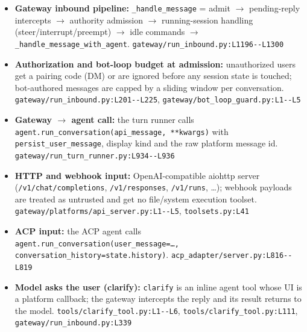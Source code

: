 \begin{itemize}
\item \textbf{Gateway inbound pipeline:} \texttt{\_\allowbreak{}handle\_\allowbreak{}message} = admit $\rightarrow$ pending-reply intercepts $\rightarrow$ authority admission $\rightarrow$ running-session handling (steer/interrupt/preempt) $\rightarrow$ idle commands $\rightarrow$ \texttt{\_\allowbreak{}handle\_\allowbreak{}message\_\allowbreak{}with\_\allowbreak{}agent}. \texttt{gateway/\allowbreak{}run\_\allowbreak{}inbound.\allowbreak{}py:\allowbreak{}L1196-\allowbreak{}-\allowbreak{}L1300}
\item \textbf{Authorization and bot-loop budget at admission:} unauthorized users get a pairing code (DM) or are ignored before any session state is touched; bot-authored messages are capped by a sliding window per conversation. \texttt{gateway/\allowbreak{}run\_\allowbreak{}inbound.\allowbreak{}py:\allowbreak{}L201-\allowbreak{}-\allowbreak{}L225}, \texttt{gateway/\allowbreak{}bot\_\allowbreak{}loop\_\allowbreak{}guard.\allowbreak{}py:\allowbreak{}L1-\allowbreak{}-\allowbreak{}L5}
\item \textbf{Gateway $\rightarrow$ agent call:} the turn runner calls \texttt{agent.\allowbreak{}run\_\allowbreak{}conversation(\allowbreak{}api\_\allowbreak{}message, **kwargs)} with \texttt{persist\_\allowbreak{}user\_\allowbreak{}message}, display kind and the raw platform message id. \texttt{gateway/\allowbreak{}run\_\allowbreak{}turn\_\allowbreak{}runner.\allowbreak{}py:\allowbreak{}L934-\allowbreak{}-\allowbreak{}L936}
\item \textbf{HTTP and webhook input:} OpenAI-compatible aiohttp server (\texttt{/\allowbreak{}v1/\allowbreak{}chat/\allowbreak{}completions}, \texttt{/\allowbreak{}v1/\allowbreak{}responses}, \texttt{/\allowbreak{}v1/\allowbreak{}runs}, \ldots{}); webhook payloads are treated as untrusted and get no file/system execution toolset. \texttt{gateway/\allowbreak{}platforms/\allowbreak{}api\_\allowbreak{}server.\allowbreak{}py:\allowbreak{}L1-\allowbreak{}-\allowbreak{}L5}, \texttt{toolsets.\allowbreak{}py:\allowbreak{}L41}
\item \textbf{ACP input:} the ACP agent calls \texttt{agent.\allowbreak{}run\_\allowbreak{}conversation(\allowbreak{}user\_\allowbreak{}message=\ldots{}, conversation\_\allowbreak{}history=state.\allowbreak{}history)}. \texttt{acp\_\allowbreak{}adapter/\allowbreak{}server.\allowbreak{}py:\allowbreak{}L816-\allowbreak{}-\allowbreak{}L819}
\item \textbf{Model asks the user (clarify):} \texttt{clarify} is an inline agent tool whose UI is a platform callback; the gateway intercepts the reply and its result returns to the model. \texttt{tools/\allowbreak{}clarify\_\allowbreak{}tool.\allowbreak{}py:\allowbreak{}L1-\allowbreak{}-\allowbreak{}L6}, \texttt{tools/\allowbreak{}clarify\_\allowbreak{}tool.\allowbreak{}py:\allowbreak{}L111}, \texttt{gateway/\allowbreak{}run\_\allowbreak{}inbound.\allowbreak{}py:\allowbreak{}L339}

\end{itemize}
